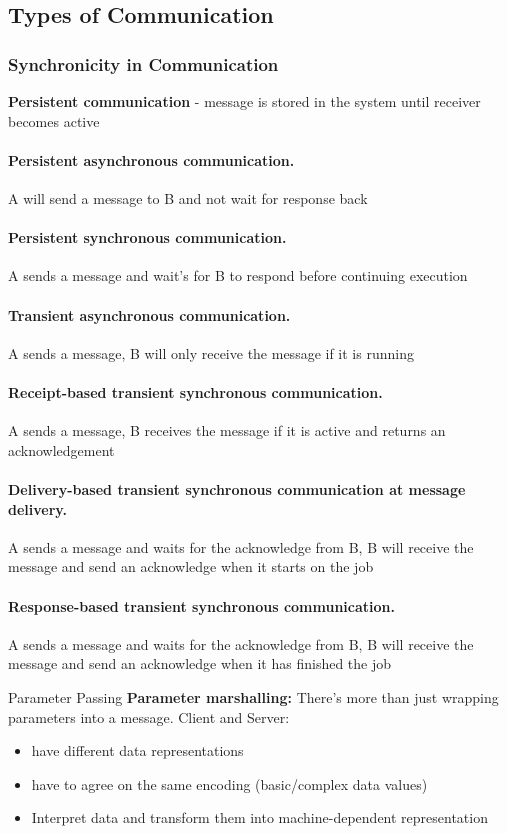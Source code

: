 \subsection{Types of Communication}
\subsubsection{Synchronicity in Communication}
\begin{leftbar}
	\textbf{Persistent communication} - message is stored in the system until receiver becomes active	
\end{leftbar}

\paragraph{Persistent asynchronous communication.} A will send a message to B and not wait for response back
\paragraph{Persistent synchronous communication.} A sends a message and wait's for B to respond before continuing execution
\paragraph{Transient asynchronous communication.} A sends a message, B will only receive the message if it is running
\paragraph{Receipt-based transient synchronous communication.} A sends a message, B receives the message if it is active and returns an acknowledgement
\paragraph{Delivery-based transient synchronous communication at message delivery.} A sends a message and waits for the acknowledge from B, B will receive the message and send an acknowledge when it starts on the job
\paragraph{Response-based transient synchronous communication.} A sends a message and waits for the acknowledge from B, B will receive the message and send an acknowledge when it has finished the job

\begin{note}{Parameter Passing}
	\textbf{Parameter marshalling:} There's more than just wrapping parameters into a message. Client and Server:
	\begin{itemize}
		\item have different data representations
		\item have to agree on the same encoding (basic/complex data values)
		\item Interpret data and transform them into machine-dependent representation	
	\end{itemize}
\end{note}

